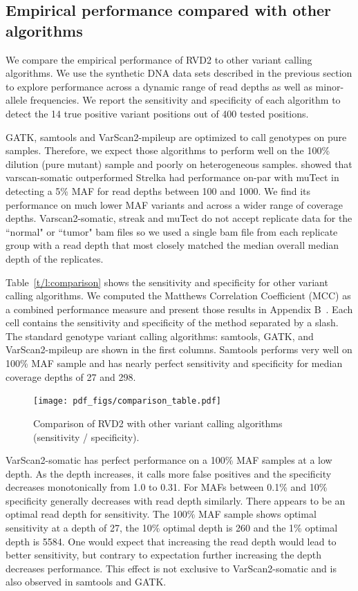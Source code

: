 \documentclass[11pt,reqno]{amsart}
\begin{document}
\subsection{Empirical performance compared with other algorithms}\label{sec:comparison}

We compare the empirical performance of RVD2 to other variant calling algorithms. We use the synthetic DNA data sets described in the previous section to explore performance across a dynamic range of read depths as well as minor-allele frequencies. We report the sensitivity and specificity of each algorithm to detect the 14 true positive variant positions out of 400 tested positions.

GATK, samtools and VarScan2-mpileup are optimized to call genotypes on pure samples. Therefore, we expect those algorithms to perform well on the 100\% dilution (pure mutant) sample and poorly on heterogeneous samples. \citet{Stead:2013fu} showed that varscan-somatic outperformed Strelka had performance on-par with muTect in detecting a 5\% MAF for read depths between 100 and 1000. We find its performance on much lower MAF variants and across a wider range of coverage depths. Varscan2-somatic, streak and muTect do not accept replicate data for the ``normal" or ``tumor" bam files so we used a single bam file from each replicate group with a read depth that most closely matched the median overall median depth of the replicates.

Table~\ref{t/l:comparison} shows the sensitivity and specificity for other variant calling algorithms. We computed the Matthews Correlation Coefficient (MCC) as a combined performance measure and present those results in Appendix B~\cite{}. Each cell contains the sensitivity and specificity of the method separated by a slash. The standard genotype variant calling algorithms: samtools, GATK, and VarScan2-mpileup are shown in the first columns. Samtools performs very well on 100\% MAF sample and has nearly perfect sensitivity and specificity for median coverage depths of 27 and 298. 

\begin{figure}[h]
\begin{center}
\texttt{[image: pdf\_figs/comparison\_table.pdf]}
\caption{Comparison of RVD2 with other variant calling algorithms (sensitivity / specificity).}
\label{fig:comparison}
\end{center}
\end{figure}

VarScan2-somatic has perfect performance on a 100\% MAF samples at a low depth. As the depth increases, it calls more false positives and the specificity decreases monotonically from 1.0 to 0.31. For MAFs between 0.1\% and 10\% specificity generally decreases with read depth similarly. There appears to be an optimal read depth for sensitivity. The 100\% MAF sample shows optimal sensitivity at a depth of 27, the 10\% optimal depth is 260 and the 1\% optimal depth is 5584. One would expect that increasing the read depth would lead to better sensitivity, but contrary to expectation further increasing the depth decreases performance. This effect is not exclusive to VarScan2-somatic and is also observed in samtools and GATK. 
\end{document}
